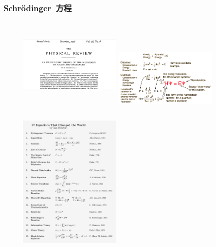 {
	\frametitle{\textrm{Schr\"odinger}~方程}
\begin{minipage}{0.49\textwidth}
\begin{figure}[h!]
\centering
%
\vspace{-25.5pt}
\includegraphics[height=1.80in,width=2.00in,viewport=180 0 1380 1100,clip]{Figures/Schrodinger_article.png}
\includegraphics[height=1.20in,width=2.00in,viewport=0 0 600 350,clip]{Figures/Schrodinger_Equation.png}
\label{Schrodinger_Equation}
\end{figure}
\end{minipage}
\begin{minipage}{0.49\textwidth}
\begin{figure}[h!]
\centering
%
\vspace{-15.5pt}
\includegraphics[height=2.85in,width=2.00in,viewport=0 0 780 1100,clip]{Figures/Great_Equation.jpg}
\label{Great_Equation}
\end{figure}
\end{minipage}
}

